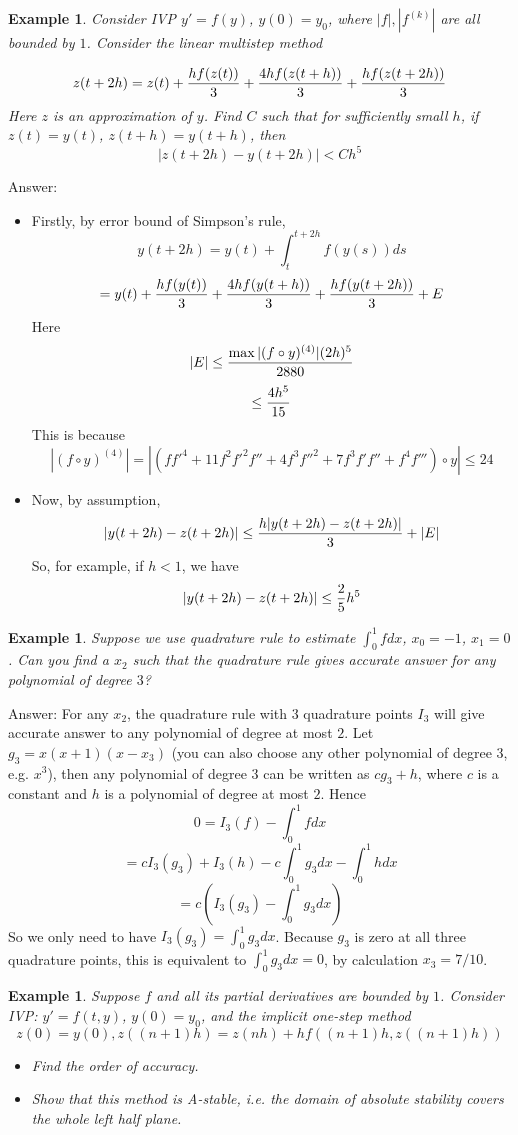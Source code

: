 \documentclass[20pt]{article} %
\theoremstyle{break}
\newtheorem{exa}[definition]{Example}
\begin{document}
\newpage

\begin{exa}Consider IVP $y'=f(y)$, $y(0)=y_0$, where $|f|, |f^{(k)}|$ are all bounded by $1$. Consider the linear multistep method

  \[z(t+2h)=z(t)+{hf(z(t))\over 3}+{4hf(z(t+h))\over 3}+{hf(z(t+2h))\over 3}\]
    Here $z$ is an approximation of $y$. Find $C$ such that for sufficiently small $h$, if $z(t)=y(t)$, $z(t+h)=y(t+h)$, then
    \[|z(t+2h)-y(t+2h)|<Ch^5\]
  \end{exa}

  Answer:
  \begin{itemize}
  \item Firstly, by error bound of Simpson's rule,
    \[y(t+2h)=y(t)+\int_t^{t+2h}f(y(s))ds\]
    \[=y(t)+{hf(y(t))\over 3}+{4hf(y(t+h))\over 3}+{hf(y(t+2h))\over 3}+E\]
    Here
    \[|E|\leq{\max|(f\circ y)^{(4)}|(2h)^5\over 2880}\]
    \[\leq {4h^5\over 15}\]
    This is because
    \[|(f\circ y)^{(4)}|=|(ff'^4+11f^2f'^2f''+4f^3f''^2+7f^3f'f''+f^4f''')\circ y|\leq 24\]
  \item Now, by assumption,
    \[|y(t+2h)-z(t+2h)|\leq {h|y(t+2h)-z(t+2h)|\over 3}+|E|\]
    So, for example, if $h<1$, we have
    \[|y(t+2h)-z(t+2h)|\leq {2\over 5}h^5\]
  \end{itemize}
  
\newpage

\begin{exa}Suppose we use quadrature rule to estimate $\int_0^1fdx$, $x_0=-1$, $x_1=0$. Can you find a $x_2$ such that the quadrature rule gives accurate answer for any polynomial of degree $3$?\end{exa}

Answer: For any $x_2$, the quadrature rule with 3 quadrature points $I_3$ will give accurate answer to any polynomial of degree at most $2$. Let $g_3=x(x+1)(x-x_3)$ (you can also choose any other polynomial of degree 3, e.g. $x^3$), then any polynomial of degree $3$ can be written as $cg_3+h$, where $c$ is a constant and $h$ is a polynomial of degree at most $2$. Hence
\[0=I_3(f)-\int_0^1fdx\]
\[=cI_3(g_3)+I_3(h)-c\int_0^1g_3dx-\int_0^1hdx\]
\[=c(I_3(g_3)-\int_0^1g_3dx)\]
So we only need to have $I_3(g_3)=\int_0^1g_3dx$. Because $g_3$ is zero at all three quadrature points, this is equivalent to $\int_0^1g_3dx=0$, by calculation $x_3=7/10$.


\newpage

\begin{exa}Suppose $f$ and all its partial derivatives are bounded by $1$. Consider IVP: $y'=f(t, y)$, $y(0)=y_0$, and the implicit one-step method
  \[z(0)=y(0), z((n+1)h)=z(nh)+hf((n+1)h, z((n+1)h))\]
  \begin{itemize}
   \item Find the order of accuracy.
   \item Show that this method is A-stable, i.e. the domain of absolute stability covers the whole left half plane.
  \end{itemize}
\end{exa}
\end{document}
